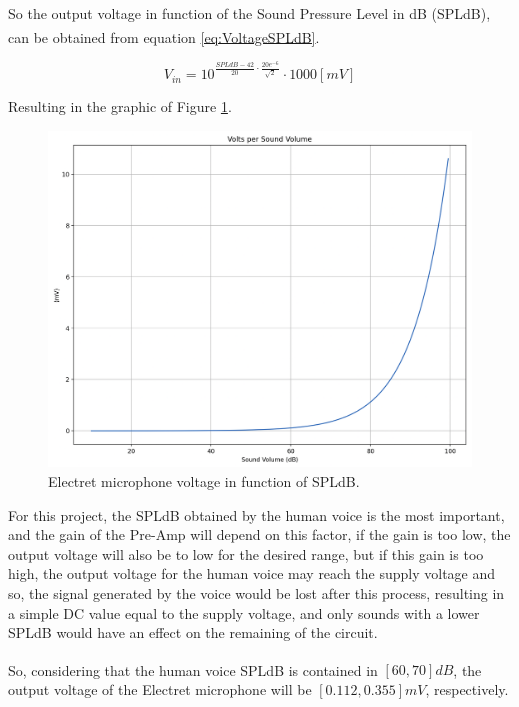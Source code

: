 So the output voltage in function of the Sound Pressure Level in dB (SPLdB), can be obtained from equation \ref{eq:VoltageSPLdB}\textsuperscript{\cite{micro-datasheet}}.

\begin{equation}
    V_{in} = 10^{\frac{SPLdB-42}{20} \cdot \frac{20e^{-6}}{\sqrt{2}} } \cdot 1000 [mV]
    \label{eq:VoltageSPLdB}
\end{equation}

Resulting in the graphic of Figure \ref{fig:GraphSPLdB}.

\begin{figure}[H]
    \centering
    \includegraphics*[scale = 0.3]{Images/GraphSPLdB.png}
    \caption{Electret microphone voltage in function of SPLdB.}
    \label{fig:GraphSPLdB}
\end{figure}

For this project, the SPLdB obtained by the human voice is the most important, and the gain of the Pre-Amp will depend on this factor, if the gain is too low, the output voltage will also be to low for the desired range, but if this gain is too high, the output voltage for the human voice may reach the supply voltage and so, the signal generated by the voice would be lost after this process, resulting in a simple DC value equal to the supply voltage, and only sounds with a lower SPLdB would have an effect on the remaining of the circuit.

So, considering that the human voice SPLdB is contained in $[60, 70]dB$\textsuperscript{\cite{micro-sens}}, the output voltage of the Electret microphone will be $[0.112, 0.355]mV$, respectively.

